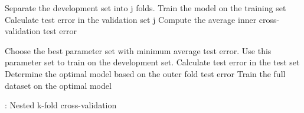 \linespacesmall
\begin{algorithm}[htb]\footnotesize
\begin{algorithmic}[1]
\parbox{15.0cm}
{
        \STATE Separate the development set into j folds. 
                \STATE Train the model on the training set
                \STATE Calculate test error in the validation set j
        \ENDFOR
        \STATE Compute the average inner cross-validation test error
    \ENDFOR
    
    \STATE Choose the best parameter set with minimum average test error.
    \STATE Use this parameter set to train on the development set.
    \STATE Calculate test error in the test set
\ENDFOR
\STATE Determine the optimal model based on the outer fold test error 
\STATE Train the full dataset on the optimal model
}
\end{algorithmic}
\caption{: Nested k-fold cross-validation}
\label{algorithm:1}
\end{algorithm}
\linespacenormal



